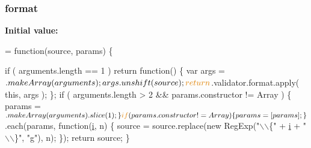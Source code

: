 \subsubsection[{format}]{\setlength{\rightskip}{0pt plus 5cm}format}\label{_bibabook_2_scripts_2jquery_8validate-vsdoc_8js_a387137c43ed9616d39ba90e890d181eb}
{\bfseries Initial value\+:}
\begin{DoxyCode}
= \textcolor{keyword}{function}(source, params) \{
    

    \textcolor{keywordflow}{if} ( arguments.length == 1 ) 
        \textcolor{keywordflow}{return} \textcolor{keyword}{function}() \{
            var args = $.makeArray(arguments);
            args.unshift(source);
            \textcolor{keywordflow}{return} $.validator.format.apply( \textcolor{keyword}{this}, args );
        \};
    \textcolor{keywordflow}{if} ( arguments.length > 2 && params.constructor != Array  ) \{
        params = $.makeArray(arguments).slice(1);
    \}
    \textcolor{keywordflow}{if} ( params.constructor != Array ) \{
        params = [ params ];
    \}
    $.each(params, \textcolor{keyword}{function}(\hyperlink{_bibabook_2_scripts_2respond_8min_8js_a5e25b1d1bed9ab5f3174b76d6a722180}{i}, n) \{
        source = source.replace(\textcolor{keyword}{new} RegExp(\textcolor{stringliteral}{"\(\backslash\)\(\backslash\)\{"} + \hyperlink{_bibabook_2_scripts_2respond_8min_8js_a5e25b1d1bed9ab5f3174b76d6a722180}{i} + \textcolor{stringliteral}{"\(\backslash\)\(\backslash\)\}"}, \textcolor{stringliteral}{"g"}), n);
    \});
    \textcolor{keywordflow}{return} source;
\}
\end{DoxyCode}
\hypertarget{_bibabook_2_scripts_2jquery_8validate-vsdoc_8js_a1e853eabf9d8ee3ac2700c9a2ddda672}{}
